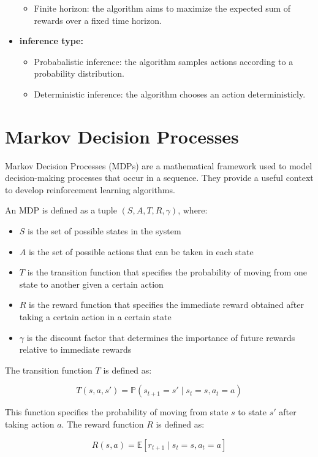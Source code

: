 \begin{minipage}{\textwidth}
\begin{itemize}
\begin{itemize}
    \item Finite horizon: the algorithm aims to maximize the expected sum of rewards over a fixed time horizon.
    \end{itemize}
    \item \textbf{inference type:}
    \begin{itemize}
    \item Probabalistic inference: the algorithm samples actions according to a probability distribution.
    \item Deterministic inference: the algorithm chooses an action deterministicly.
    \end{itemize}
    \end{itemize}
\end{minipage}

\section{Markov Decision Processes}
Markov Decision Processes (MDPs) are a mathematical framework used to model decision-making processes that occur in a sequence. They provide a useful 
context to develop reinforcement learning algorithms.

An MDP is defined as a tuple $(S, A, T, R, \gamma)$, where:
\begin{itemize}
    \item $S$ is the set of possible states in the system
    \item $A$ is the set of possible actions that can be taken in each state
    \item $T$ is the transition function that specifies the probability of moving from one state to another given a certain action
    \item $R$ is the reward function that specifies the immediate reward obtained after taking a certain action in a certain state
    \item $\gamma$ is the discount factor that determines the importance of future rewards relative to immediate rewards
\end{itemize}

The transition function $T$ is defined as:

$$T(s, a, s') = \mathbb{P}(s_{t+1}=s' \mid s_t=s, a_t=a)$$

This function specifies the probability of moving from state $s$ to state $s'$ after taking action $a$. The reward function $R$ is defined as:

$$R(s, a) = \mathbb{E}[r_{t+1} \mid s_t=s, a_t=a]$$

